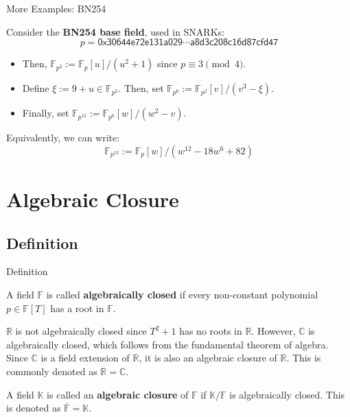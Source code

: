 \documentclass{zkdl-presentation-template}
\begin{document}
    \begin{frame}{More Examples: BN254}
        \begin{example}
            Consider the \textbf{BN254 base field}, used in SNARKs:
            \begin{equation*}
                p = \mathsf{0x30644e72e131a029\cdots a8d3c208c16d87cfd47}
            \end{equation*}
            \begin{itemize}
                \item Then, $\mathbb{F}_{p^2} := \mathbb{F}_p[u]/(u^2+1)$ since $p \equiv 3 \pmod{4}$.\pause
                \item Define $\xi := 9+u \in \mathbb{F}_{p^2}$. Then, set $\mathbb{F}_{p^6}:=\mathbb{F}_{p^2}[v]/(v^3-\xi)$.\pause
                \item Finally, set $\mathbb{F}_{p^{12}} := \mathbb{F}_{p^6}[w]/(w^2-v)$.\pause
            \end{itemize}

            Equivalently, we can write:
            \begin{equation*}
                \mathbb{F}_{p^{12}} := \mathbb{F}_p[w]/(w^{12}-18w^6+82)
            \end{equation*}
        \end{example}
    \end{frame}

    \section{Algebraic Closure}
    \subsection{Definition}

    \begin{frame}{Definition}
        \begin{definition}
            A field $\mathbb{F}$ is called \textbf{algebraically closed} if every non-constant polynomial $p \in \mathbb{F}[T]$ has a root in $\mathbb{F}$.\pause
        \end{definition}

        \begin{example}
            $\mathbb{R}$ is not algebraically closed since $T^2+1$ has no roots in $\mathbb{R}$. However, $\mathbb{C}$ is algebraically closed, which follows from the fundamental theorem of algebra. Since $\mathbb{C}$ is a field extension of $\mathbb{R}$, it is also an algebraic closure of $\mathbb{R}$. This is commonly denoted as $\overline{\mathbb{R}} = \mathbb{C}$.\pause
        \end{example}

        \begin{definition}
            A field $\mathbb{K}$ is called an \textbf{algebraic closure} of $\mathbb{F}$ if $\mathbb{K}/\mathbb{F}$ is algebraically closed. This is denoted as $\overline{\mathbb{F}} = \mathbb{K}$.
        \end{definition}
    \end{frame}
\end{document}
